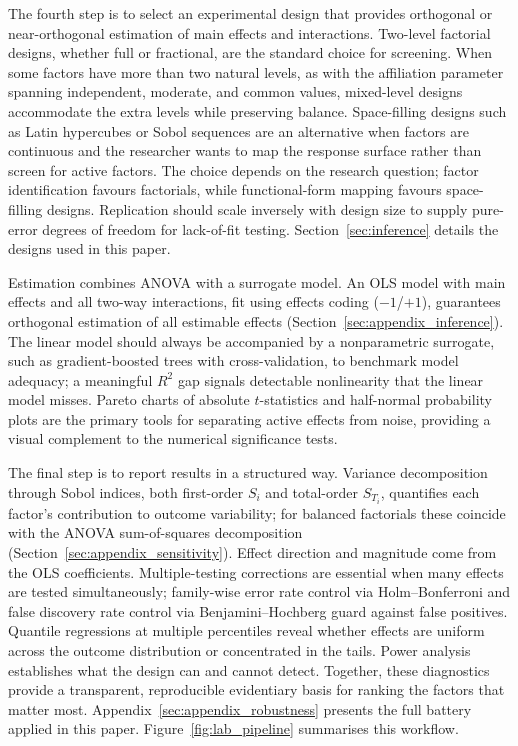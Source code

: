 The fourth step is to select an experimental design that provides orthogonal or near-orthogonal estimation of main effects and interactions. Two-level factorial designs, whether full or fractional, are the standard choice for screening. When some factors have more than two natural levels, as with the affiliation parameter spanning independent, moderate, and common values, mixed-level designs accommodate the extra levels while preserving balance. Space-filling designs such as Latin hypercubes or Sobol sequences are an alternative when factors are continuous and the researcher wants to map the response surface rather than screen for active factors. The choice depends on the research question; factor identification favours factorials, while functional-form mapping favours space-filling designs. Replication should scale inversely with design size to supply pure-error degrees of freedom for lack-of-fit testing. Section~\ref{sec:inference} details the designs used in this paper.

Estimation combines ANOVA with a surrogate model. An OLS model with main effects and all two-way interactions, fit using effects coding ($-1$/$+1$), guarantees orthogonal estimation of all estimable effects (Section~\ref{sec:appendix_inference}). The linear model should always be accompanied by a nonparametric surrogate, such as gradient-boosted trees with cross-validation, to benchmark model adequacy; a meaningful $R^2$ gap signals detectable nonlinearity that the linear model misses. Pareto charts of absolute $t$-statistics and half-normal probability plots are the primary tools for separating active effects from noise, providing a visual complement to the numerical significance tests.

The final step is to report results in a structured way. Variance decomposition through Sobol indices, both first-order $S_i$ and total-order $S_{T_i}$, quantifies each factor's contribution to outcome variability; for balanced factorials these coincide with the ANOVA sum-of-squares decomposition (Section~\ref{sec:appendix_sensitivity}). Effect direction and magnitude come from the OLS coefficients. Multiple-testing corrections are essential when many effects are tested simultaneously; family-wise error rate control via Holm--Bonferroni and false discovery rate control via Benjamini--Hochberg guard against false positives. Quantile regressions at multiple percentiles reveal whether effects are uniform across the outcome distribution or concentrated in the tails. Power analysis establishes what the design can and cannot detect. Together, these diagnostics provide a transparent, reproducible evidentiary basis for ranking the factors that matter most. Appendix~\ref{sec:appendix_robustness} presents the full battery applied in this paper. Figure~\ref{fig:lab_pipeline} summarises this workflow.

